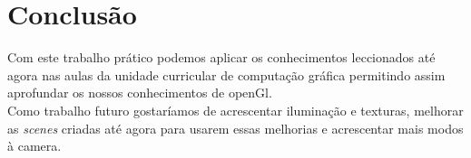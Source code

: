 \documentclass[a4paper]{report}
\begin{document}
\chapter{Conclusão}
Com este trabalho prático podemos aplicar os conhecimentos leccionados até agora
nas aulas da unidade curricular de computação gráfica permitindo assim
aprofundar os nossos conhecimentos de openGl.\\
Como trabalho futuro gostaríamos de acrescentar iluminação e texturas, melhorar
as \textit{scenes} criadas até agora para usarem essas melhorias e acrescentar
mais modos à camera.
\end{document}

